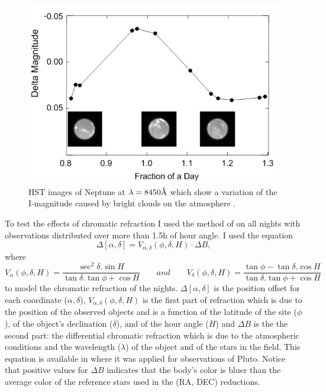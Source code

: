 \documentclass[12pt,a4paper]{report}
\begin{document}
\begin{figure}[H]
\centering
\includegraphics[scale=1]{netuno-day.png}
\caption{HST images of Neptune at $\lambda=8450 \mbox{\normalfont\AA}$ which show a variation of the I-magnitude caused by bright clouds on the atmosphere \citep{Schmude2016}.\label{Fig:netuno-nuvem}}
\end{figure}



To test the effects of chromatic refraction I used the method of \cite{Benedetti-Rossi2014} on all nights with observations distributed over more than 1.5h of hour angle. I used the equation \:
\begin{equation}
\Delta [\alpha, \delta] = V_{\alpha,\delta} (\phi,\delta, H) \cdot \Delta B,
\label{Eq:refraction}
\end{equation}
where
\begin{equation}
V_\alpha (\phi, \delta, H) = \frac{\sec^2 \delta . \sin H}{\tan \delta . \tan \phi + \cos H} \qquad and \qquad V_\delta (\phi, \delta, H) = \frac{\tan \phi - \tan \delta . \cos H}{\tan \delta . \tan \phi + \cos H}
\label{Eq:refraction}
\end{equation}
to model the chromatic refraction of the nights. $\Delta [\alpha, \delta]$ is the position offset for each coordinate ($\alpha, \delta$), $V_{\alpha,\delta} (\phi,\delta, H)$ is the first part of refraction which is due to the position of the observed objects and is a function of the latitude of the site ($\phi$), of the object’s declination ($\delta$), and of the hour angle ($H$) and $\Delta B$ is the the second part: the differential chromatic refraction which is due to the atmospheric conditions and the wavelength ($\lambda$) of the object and of the stars in the field. This equation is available in \cite{Benedetti-Rossi2014} where it was applied for observations of Pluto. Notice that positive values for $\Delta B$ indicates that the body's color is bluer than the average color of the reference stars used in the (RA, DEC) reductions.
\end{document}
